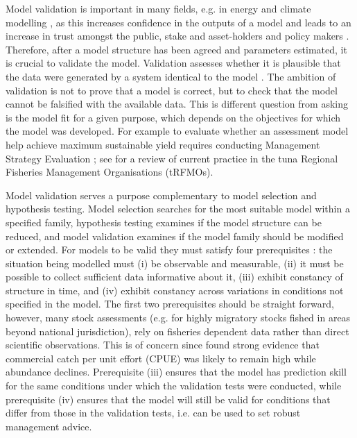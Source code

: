 \documentclass[12pt,halfline,a4paper,nonumbib]{ouparticle}
\begin{document}
Model validation is important in many fields, e.g. in energy and climate modelling \parencite{kell2019optimising}, as this increases confidence in the outputs of a model and leads to an increase in trust amongst the public, stake and asset-holders and policy makers \parencite[][]{saltelli2020five}. Therefore, after a model structure has been agreed and parameters estimated, it is crucial to validate the model. Validation assesses whether it is plausible that the data were generated by a system identical to the model \parencite{thygesen2017validation}. The ambition of validation is not to prove that a model is correct, but to check that the model cannot be falsified with the available data. This is different question from asking is the model fit for a given purpose, which depends on the objectives for which the model was developed. For example to evaluate whether an assessment model help achieve maximum sustainable yield requires conducting Management Strategy Evaluation \parencite[MSE,][]{punt2007developing}; see \cite{sharma2020trfmo} for a review of current practice in the tuna Regional Fisheries Management Organisations (tRFMOs).   

Model validation serves a purpose complementary to model selection and hypothesis testing. Model selection searches for the most suitable model within a specified family, hypothesis testing examines if the model structure can be reduced, and model validation examines if the model family should be modified or extended. For models to be valid they must satisfy four prerequisites \parencite{hodges1992you}: the situation being modelled must (i) be observable and measurable, (ii) it must be possible to collect sufficient data informative about it, (iii) exhibit constancy of structure in time, and (iv) exhibit constancy across variations in conditions not specified in the model. The first two prerequisites should be straight forward, however, many stock assessments (e.g. for highly migratory stocks fished in areas beyond national jurisdiction), rely on fisheries dependent data rather than direct scientific observations. This is of concern since \cite{harley2001catch} found strong evidence that commercial catch per unit effort (CPUE) was likely to remain high while abundance declines.  Prerequisite (iii) ensures that the model has prediction skill for the same conditions under which the validation tests were conducted, while prerequisite (iv) ensures that the model will still be valid for conditions that differ from those in the validation tests, i.e. can be used to set robust management advice.
\end{document}

